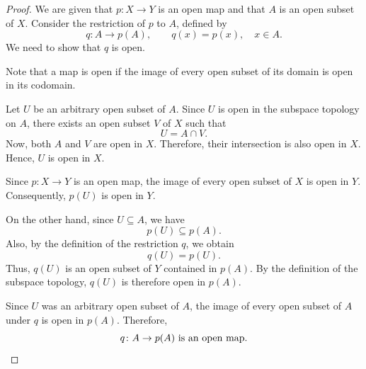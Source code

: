 
\begin{proof}
We are given that $p\colon X\to Y$ is an open map and that $A$ is an open subset of $X$.
Consider the restriction of $p$ to $A$, defined by
\[ q\colon A\longrightarrow p(A),\qquad q(x)=p(x),\quad x\in A. \]
We need to show that $q$ is open.

Note that a map is open if the image of every open subset of its domain is open in its
codomain.

Let $U$ be an arbitrary open subset of $A$. Since $U$ is open in the subspace topology on
$A$, there exists an open subset $V$ of $X$ such that
\[ U=A\cap V. \]
Now, both $A$ and $V$ are open in $X$. Therefore, their intersection is also open in $X$.
Hence, $U$ is open in $X$.

Since $p\colon X\to Y$ is an open map, the image of every open subset of $X$ is open in $Y$.
Consequently, $p(U)$ is open in $Y$.

On the other hand, since $U\subseteq A$, we have
\[ p(U)\subseteq p(A). \]
Also, by the definition of the restriction $q$, we obtain
\[ q(U)=p(U). \]
Thus, $q(U)$ is an open subset of $Y$ contained in $p(A)$. By the definition of the subspace
topology, $q(U)$ is therefore open in $p(A)$.

Since $U$ was an arbitrary open subset of $A$, the image of every open subset of $A$ under $q$
is open in $p(A)$. Therefore,
\[ q\colon A\to p(A)\ \text{is an open map.} \qedhere \]
\end{proof}
